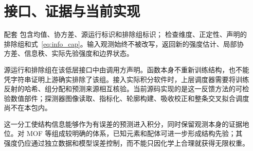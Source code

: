 \section{接口、证据与当前实现}
配套  包含均值、协方差、源运行标识和排除组标识； 检查维度、正定性、声明的排除组和式~\eqref{eq:info_cap}。输入观测始终不被改写，返回新的强度估计、局部协方差、信息秩、实际先验强度和边界状态。

源运行和排除组在该低层接口中由调用方声明。函数本身不重新训练结构，也不能凭字符串证明上游确实排除了该组。接入实际积分软件时，上层调度器需要将训练反射的哈希、组分配和预测来源相互核验。当前源码实现的是这一反馈方法的可检验数值部件；探测器图像读取、指标化、轮廓构建、吸收校正和整条交叉拟合调度尚不在本包内。

这一分工使结构信息能够作为有误差的预测进入积分，同时保留观测本身的证据地位。对 MOF 等组成较明确的体系，已知元素和配体可进一步形成结构先验；其强度仍应通过独立数据和模型误差控制，而不能只因化学上合理就获得无限权重。
